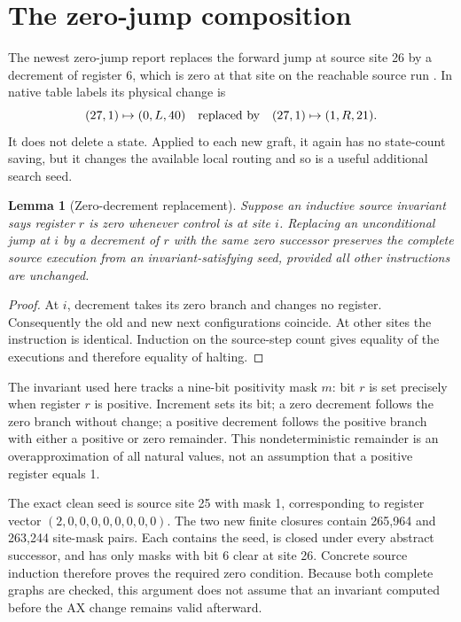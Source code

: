 \documentclass[11pt,letterpaper]{article}
\newtheorem{lemma}{Lemma}[section]
\begin{document}
\section{The zero-jump composition}

The newest zero-jump report replaces the forward jump at source site 26
by a decrement of register 6, which is zero at that site on the reachable
source run \cite{zerojump}. In native table labels its physical change is
\[
       (27,1)\mapsto(0,L,40)
       \quad\hbox{replaced by}\quad
       (27,1)\mapsto(1,R,21).
\]
It does not delete a state. Applied to each new graft, it again has no
state-count saving, but it changes the available local routing and so is
a useful additional search seed.

\begin{lemma}[Zero-decrement replacement]
Suppose an inductive source invariant says register $r$ is zero whenever
control is at site $i$. Replacing an unconditional jump at $i$ by a
decrement of $r$ with the same zero successor preserves the complete
source execution from an invariant-satisfying seed, provided all other
instructions are unchanged.
\end{lemma}
\begin{proof}
At $i$, decrement takes its zero branch and changes no register.
Consequently the old and new next configurations coincide. At other
sites the instruction is identical. Induction on the source-step count
gives equality of the executions and therefore equality of halting.
\end{proof}

The invariant used here tracks a nine-bit positivity mask $m$: bit $r$
is set precisely when register $r$ is positive. Increment sets its bit;
a zero decrement follows the zero branch without change; a positive
decrement follows the positive branch with either a positive or zero
remainder. This nondeterministic remainder is an overapproximation of
all natural values, not an assumption that a positive register equals 1.

The exact clean seed is source site 25 with mask 1, corresponding to
register vector $(2,0,0,0,0,0,0,0,0)$. The two new finite closures contain
265,964 and 263,244 site-mask pairs. Each contains the seed, is closed
under every abstract successor, and has only masks with bit 6 clear at
site 26. Concrete source induction therefore proves the required zero
condition. Because both complete graphs are checked, this argument does
not assume that an invariant computed before the AX change remains valid
afterward.
\end{document}
